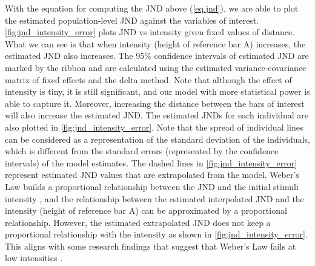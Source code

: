 With the equation for computing the JND above (\autoref{eq.jnd}), we are able to plot the estimated population-level JND against the variables of interest. \autoref{fig:jnd_intensity_error} plots JND vs intensity given fixed values of distance. What we can see is that when intensity (height of reference bar A) increases, the estimated JND also increases. The 95\% confidence intervals of estimated JND are marked by the ribbon and are calculated using the estimated variance-covariance matrix of fixed effects and the delta method. Note that although the effect of intensity is tiny, it is still significant, and our model with more statistical power is able to capture it. Moreover, increasing the distance between the bars of interest will also increase the estimated JND. 
The estimated JNDs for each individual are also plotted in \autoref{fig:jnd_intensity_error}. Note that the spread of individual lines can be considered as a representation of the standard deviation of the individuals, which is different from the standard errors (represented by the confidence intervals) of the model estimates. 
The dashed lines in \autoref{fig:jnd_intensity_error} represent estimated JND values that are extrapolated from the model. Weber's Law builds a proportional relationship between the JND and the initial stimuli intensity \cite{kandel_principles_2013}, and the relationship between the estimated interpolated JND and the intensity (height of reference bar A) can be approximated by a proportional relationship. However, the estimated extrapolated JND does not keep a proportional relationship with the intensity as shown in \autoref{fig:jnd_intensity_error}. This aligns with some research findings that suggest that Weber's Law fails at low intensities \cite{norris_system_1900}.



